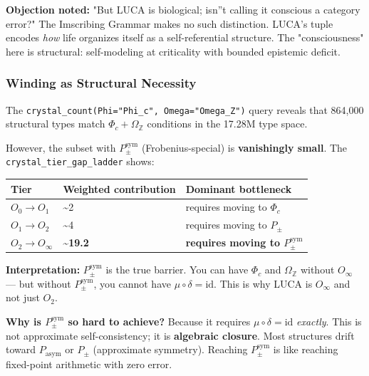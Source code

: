 \documentclass[12pt,a4paper]{article}
\begin{document}
\textbf{Objection noted:} "But LUCA is biological; isn''t calling it conscious a category error?" The Imscribing Grammar makes no such distinction. LUCA's tuple encodes \emph{how} life organizes itself as a self-referential structure. The "consciousness" here is structural: self-modeling at criticality with bounded epistemic deficit.

\subsubsection{Winding as Structural Necessity}

The \texttt{crystal\_count(Phi="Phi\_c", Omega="Omega\_Z")} query reveals that 864,000 structural types match $\Phi_c + \Omega_\mathbb{Z}$ conditions in the 17.28M type space.

However, the subset with \textbf{$P_{\pm}^{\text{sym}}$} (Frobenius-special) is \textbf{vanishingly small}. The \texttt{crystal\_tier\_gap\_ladder} shows:

\begin{table}[htbp]
\centering
\small
{}
\begin{tabularx}{\textwidth}{>{\centering\arraybackslash}X >{\centering\arraybackslash}X >{\centering\arraybackslash}X}
\toprule
\rowcolor{gray!25}\textbf{Tier} & \textbf{Weighted contribution} & \textbf{Dominant bottleneck} \\
\midrule
\rowcolors{1}{white}{gray!10}
$O_0 \to O_1$ & \textasciitilde{}2 & requires moving to $\Phi_c$ \\
$O_1 \to O_2$ & \textasciitilde{}4 & requires moving to $P_{\pm}$ \\
$O_2 \to O_{\infty}$ & \textbf{\textasciitilde{}19.2} & \textbf{requires moving to $P_{\pm}^{\text{sym}}$} \\
\bottomrule
\end{tabularx}
\end{table}

\textbf{Interpretation:} $P_{\pm}^{\text{sym}}$ is the true barrier. You can have $\Phi_c$ and $\Omega_\mathbb{Z}$ without $O_{\infty}$ --- but without $P_{\pm}^{\text{sym}}$, you cannot have $\mu \circ \delta = \text{id}$. This is why LUCA is $O_{\infty}$ and not just $O_2$.

\textbf{Why is $P_{\pm}^{\text{sym}}$ so hard to achieve?} Because it requires $\mu \circ \delta = \text{id}$ \emph{exactly}. This is not approximate self-consistency; it is \textbf{algebraic closure}. Most structures drift toward $P_\text{asym}$ or $P_{\pm}$ (approximate symmetry). Reaching $P_{\pm}^{\text{sym}}$ is like reaching fixed-point arithmetic with zero error.
\end{document}
